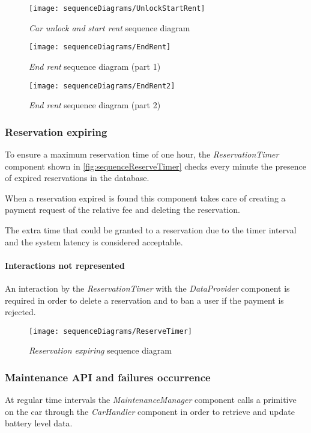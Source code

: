 \begin{figure}[h!]
	\centering
	\texttt{[image: sequenceDiagrams/UnlockStartRent]}
	\caption{
		\label{fig:sequenceUnlockStartRent} 
		\emph{Car unlock and start rent} sequence diagram
	}
\end{figure}
\begin{figure}[h!]
	\centering
	\texttt{[image: sequenceDiagrams/EndRent]}
	\caption{
		\label{fig:sequenceEndRent1} 
		\emph{End rent} sequence diagram (part 1)
	}
\end{figure}
\begin{figure}[h!]
	\centering
	\texttt{[image: sequenceDiagrams/EndRent2]}
	\caption{
		\label{fig:sequenceEndRent2} 
		\emph{End rent} sequence diagram (part 2)
	}
\end{figure}

\clearpage
\subsubsection{Reservation expiring}
To ensure a maximum reservation time of one hour, the \emph{ReservationTimer} component shown in \autoref{fig:sequenceReserveTimer} checks every minute the presence of expired reservations in the database. 

When a reservation expired is found this component takes care of creating a payment request of the relative fee and deleting the reservation. 

The extra time that could be granted to a reservation due to the timer interval and the system latency is considered acceptable.

\paragraph{Interactions not represented} An interaction by the \emph{ReservationTimer} with the \emph{DataProvider} component is required in order to delete a reservation and to ban a user if the payment is rejected.
\begin{figure}[h!]
	\centering
	\texttt{[image: sequenceDiagrams/ReserveTimer]}
	\caption{
		\label{fig:sequenceReserveTimer} 
		\emph{Reservation expiring} sequence diagram
	}
\end{figure}

\clearpage
\subsubsection{Maintenance API and failures occurrence}
At regular time intervals the \emph{MaintenanceManager} component calls a primitive on the car through the \emph{CarHandler} component in order to retrieve and update battery level data.

